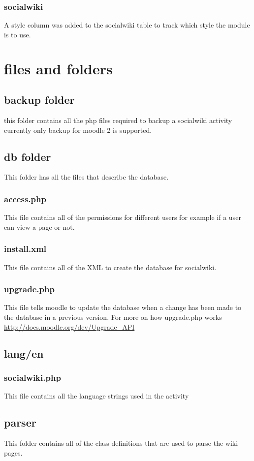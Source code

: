 \documentclass[letterpaper,twoside,12pt]{report}
\begin{document}
	\subsection{socialwiki}
	A style column was added to the socialwiki table to track which style the module is to use.
	
	\chapter{files and folders}
	\section{backup folder}
	this folder contains all the php files required to backup a socialwiki activity
	currently only backup for moodle 2 is supported.
	\section{db folder}
	This folder has all the files that describe the database.
	\subsection{access.php}
	This file contains all of the permissions for different users for example if a user can view a page or not.
	\subsection{install.xml}
	This file contains all of the XML to create the database for socialwiki.
	\subsection{upgrade.php}
	This file tells moodle to update the database when a change has been made to the database in a previous version. For more on how upgrade.php works \url{http://docs.moodle.org/dev/Upgrade_API} 
	\section{lang/en}
	\subsection{socialwiki.php}
	This file contains all the language strings used in the activity
	\section{parser}
	This folder contains all of the class definitions that are used to parse the wiki pages.
\end{document}
